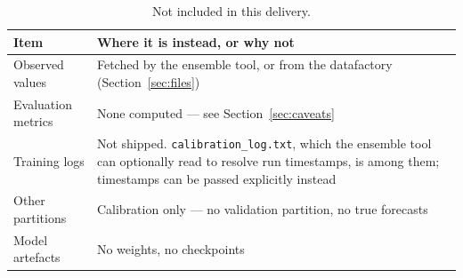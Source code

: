 \begin{table}[h!]
\centering
\renewcommand{\arraystretch}{1.3}
\caption{Not included in this delivery.}
\label{tab:not-included}
\begin{tabular}{@{}p{4cm}p{10cm}@{}}
\toprule
\textbf{Item} & \textbf{Where it is instead, or why not} \\ \midrule
Observed values     & Fetched by the ensemble tool, or from the datafactory
                      (Section~\ref{sec:files}) \\
Evaluation metrics  & None computed --- see Section~\ref{sec:caveats} \\
Training logs       & Not shipped. \texttt{calibration\_log.txt}, which the ensemble tool can
                      optionally read to resolve run timestamps, is among them; timestamps can be
                      passed explicitly instead \\
Other partitions    & Calibration only --- no validation partition, no true forecasts \\
Model artefacts     & No weights, no checkpoints \\
\bottomrule
\end{tabular}
\end{table}
